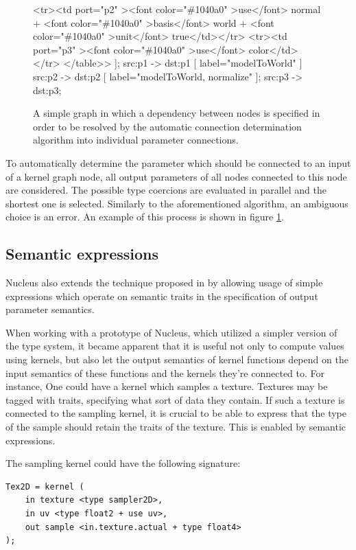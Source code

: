 \begin{figure}[h!]
{{    			<tr><td port="p2" ><font color="\#1040a0" >use</font> normal + <font color="\#1040a0" >basis</font> world + <font color="\#1040a0" >unit</font> true</td></tr>
    			<tr><td port="p3" ><font color="\#1040a0" >use</font> color</td></tr>
    			</table>>
    		];
    		src:p1 -> dst:p1 [ label="modelToWorld" ]
    		src:p2 -> dst:p2 [ label="modelToWorld, normalize" ];
    		src:p3 -> dst:p3;
	}}
  \caption[Automatic connection determination example]{A simple graph in which a dependency between nodes is specified in order to be resolved by the automatic connection determination algorithm into individual parameter connections.}
  \label{fig:AutoSemanticGraph}
\end{figure}

To automatically determine the parameter which should be connected to an input of a kernel graph node, all output parameters of all nodes connected to this node are considered. The possible type coercions are evaluated in parallel and the shortest one is selected. Similarly to the aforementioned algorithm, an ambiguous choice is an error. An example of this process is shown in figure \ref{fig:AutoSemanticGraph}.

\subsection{Semantic expressions}
\label{sec:SemanticExpressions}

Nucleus also extends the technique proposed in \cite{mcguire2006shadetrees} by allowing usage of simple expressions which operate on semantic traits in the specification of output parameter semantics.

When working with a prototype of Nucleus, which utilized a simpler version of the type system, it became apparent that it is useful not only to compute values using kernels, but also let the output semantics of kernel functions depend on the input semantics of these functions and the kernels they're connected to. For instance, One could have a kernel which samples a texture. Textures may be tagged with traits, specifying what sort of data they contain. If such a texture is connected to the sampling kernel, it is crucial to be able to express that the type of the sample should retain the traits of the texture. This is enabled by semantic expressions.

The sampling kernel could have the following signature:

\begin{lstlisting}[frame=single]
Tex2D = kernel (
    in texture <type sampler2D>,
    in uv <type float2 + use uv>,
    out sample <in.texture.actual + type float4>
);
\end{lstlisting}

